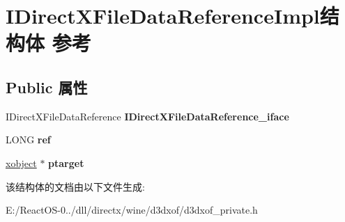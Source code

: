 \hypertarget{struct_i_direct_x_file_data_reference_impl}{}\section{I\+Direct\+X\+File\+Data\+Reference\+Impl结构体 参考}
\label{struct_i_direct_x_file_data_reference_impl}
\subsection*{Public 属性}
\begin{DoxyCompactItemize}
\item 
\mbox{\label{struct_i_direct_x_file_data_reference_impl_af16b9e5f8ebd03c1d65f4d227699367d}} 
I\+Direct\+X\+File\+Data\+Reference {\bfseries I\+Direct\+X\+File\+Data\+Reference\+\_\+iface}
\item 
\mbox{\label{struct_i_direct_x_file_data_reference_impl_aec28a4445fc745d98630d09dee495b31}} 
L\+O\+NG {\bfseries ref}
\item 
\mbox{\label{struct_i_direct_x_file_data_reference_impl_adc7590a743f7c0a4effdf5173e9bfbb6}} 
\hyperlink{struct__xobject}{xobject} $\ast$ {\bfseries ptarget}
\end{DoxyCompactItemize}


该结构体的文档由以下文件生成\+:\begin{DoxyCompactItemize}
\item 
E\+:/\+React\+O\+S-\/0../dll/directx/wine/d3dxof/d3dxof\+\_\+private.\+h\end{DoxyCompactItemize}

